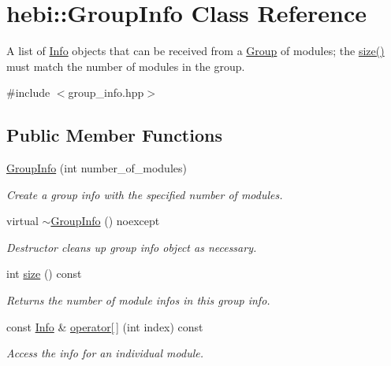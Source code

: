 \hypertarget{classhebi_1_1GroupInfo}{}\section{hebi\+:\+:Group\+Info Class Reference}
\label{classhebi_1_1GroupInfo}


A list of \hyperlink{classhebi_1_1Info}{Info} objects that can be received from a \hyperlink{classhebi_1_1Group}{Group} of modules; the \hyperlink{classhebi_1_1GroupInfo_a40fad914850d6fdf6273cdd780cd172c}{size()} must match the number of modules in the group.  




{\ttfamily \#include $<$group\+\_\+info.\+hpp$>$}

\subsection*{Public Member Functions}
\begin{DoxyCompactItemize}
\item 
\mbox{\label{classhebi_1_1GroupInfo_adb2618d3baaadb15328d04427e64d9fc}} 
\hyperlink{classhebi_1_1GroupInfo_adb2618d3baaadb15328d04427e64d9fc}{Group\+Info} (int number\+\_\+of\+\_\+modules)
\begin{DoxyCompactList}\small\item\em Create a group info with the specified number of modules. \end{DoxyCompactList}\item 
\mbox{\label{classhebi_1_1GroupInfo_a2bdd19dd45afff8c0d6a3e212f0a75e6}} 
virtual \hyperlink{classhebi_1_1GroupInfo_a2bdd19dd45afff8c0d6a3e212f0a75e6}{$\sim$\+Group\+Info} () noexcept
\begin{DoxyCompactList}\small\item\em Destructor cleans up group info object as necessary. \end{DoxyCompactList}\item 
\mbox{\label{classhebi_1_1GroupInfo_a40fad914850d6fdf6273cdd780cd172c}} 
int \hyperlink{classhebi_1_1GroupInfo_a40fad914850d6fdf6273cdd780cd172c}{size} () const
\begin{DoxyCompactList}\small\item\em Returns the number of module infos in this group info. \end{DoxyCompactList}\item 
\mbox{\label{classhebi_1_1GroupInfo_a74aba113280ada4f92014c6d6993139f}} 
const \hyperlink{classhebi_1_1Info}{Info} \& \hyperlink{classhebi_1_1GroupInfo_a74aba113280ada4f92014c6d6993139f}{operator\mbox{[}$\,$\mbox{]}} (int index) const
\begin{DoxyCompactList}\small\item\em Access the info for an individual module. \end{DoxyCompactList}\end{DoxyCompactItemize}
